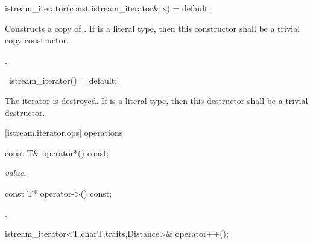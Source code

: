 %
\begin{itemdecl}
istream_iterator(const istream_iterator& x) = default;
\end{itemdecl}

\begin{itemdescr}
\pnum
\effects
Constructs a copy of . If  is a literal type, then this constructor shall be a trivial copy constructor.

\pnum
\postcondition {}.
\end{itemdescr}

%
\begin{itemdecl}
~istream_iterator() = default;
\end{itemdecl}

\begin{itemdescr}
\pnum
\effects
The iterator is destroyed. If  is a literal type, then this destructor shall be a trivial destructor.
\end{itemdescr}

[istream.iterator.ops]{ operations}

%
%
\begin{itemdecl}
const T& operator*() const;
\end{itemdecl}

\begin{itemdescr}
\pnum
\returns
\textit{value}.
\end{itemdescr}

%
%
\begin{itemdecl}
const T* operator->() const;
\end{itemdecl}

\begin{itemdescr}
\pnum
\returns
{}.
\end{itemdescr}

%
%
\begin{itemdecl}
istream_iterator<T,charT,traits,Distance>& operator++();
\end{itemdecl}

